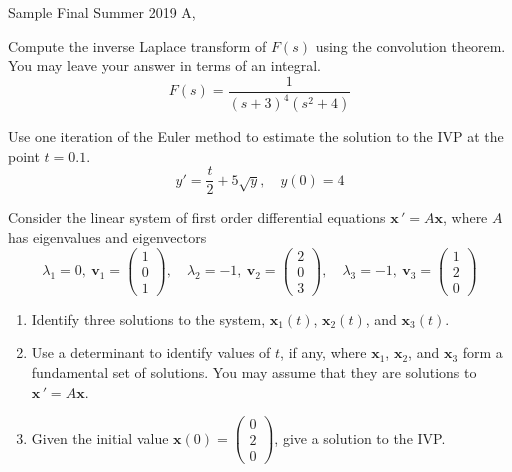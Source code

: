 \documentclass[12pt]{exam}
\newcommand{\TestName}{Sample Final Summer 2019 A}
\begin{document}
    


\begin{center}
{\Large \TestName, \Course }
\end{center}


\begin{questions}


    \question[6] %
    Compute the inverse Laplace transform of $F(s)$ using the convolution theorem. You may leave your answer in terms of an integral. 
    $$F(s) = \frac{1}{(s+3)^4(s^2+4)}$$  %
    
    \vspace{8cm} 
    
    \question[2] %
    Use one iteration of the Euler method to estimate the solution to the IVP at the point $t = 0.1$. 
    $$y' = \frac t2 + 5\sqrt y, \quad y(0) = 4$$ %
    
    
    
\newpage \InitialsLeft

    \question[6] Consider the linear system of first order differential equations $\displaystyle \mathbf x \, ' = A \mathbf x$, where $A$ has eigenvalues and eigenvectors 
    $$\lambda_1 = 0, \ \mathbf v_1 = \begin{pmatrix} 1 \\ 0 \\ 1 \end{pmatrix}, 
    \quad \lambda _2 = -1 , \  \mathbf v_2 = \begin{pmatrix} 2 \\ 0 \\ 3 \end{pmatrix}, 
    \quad \lambda _3 = -1 , \  \mathbf v_3 = \begin{pmatrix} 1 \\ 2 \\ 0 \end{pmatrix} 
    $$
    
    \begin{enumerate}[label=\roman*)]
      \item Identify three solutions to the system, $\mathbf x_1(t)$, $\mathbf x_2(t)$, and $\mathbf x_3(t)$. 
      \vspace{3cm} 
      \item Use a determinant to identify values of $t$, if any, where $\mathbf x_1$, $\mathbf x_2$, and $\mathbf x_3$ form a fundamental set of solutions. You may assume that they are solutions to $\mathbf x \, ' = A\mathbf x$. 
      \vspace{3cm}
      \item Given the initial value $\mathbf x(0) = \begin{pmatrix}0\\2\\0\end{pmatrix}$, give a solution to the IVP.  
      

\end{enumerate}
\end{questions}
\end{document}
